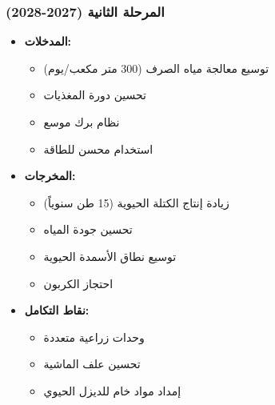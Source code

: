 \subsubsection{المرحلة الثانية (2027-2028)}
\begin{itemize}
    \item \textbf{المدخلات:}
    \begin{itemize}
        \item توسيع معالجة مياه الصرف (300 متر مكعب/يوم)
        \item تحسين دورة المغذيات
        \item نظام برك موسع
        \item استخدام محسن للطاقة
    \end{itemize}
    \item \textbf{المخرجات:}
    \begin{itemize}
        \item زيادة إنتاج الكتلة الحيوية (15 طن سنوياً)
        \item تحسين جودة المياه
        \item توسيع نطاق الأسمدة الحيوية
        \item احتجاز الكربون
    \end{itemize}
    \item \textbf{نقاط التكامل:}
    \begin{itemize}
        \item وحدات زراعية متعددة
        \item تحسين علف الماشية
        \item إمداد مواد خام للديزل الحيوي
    \end{itemize}
\end{itemize}

